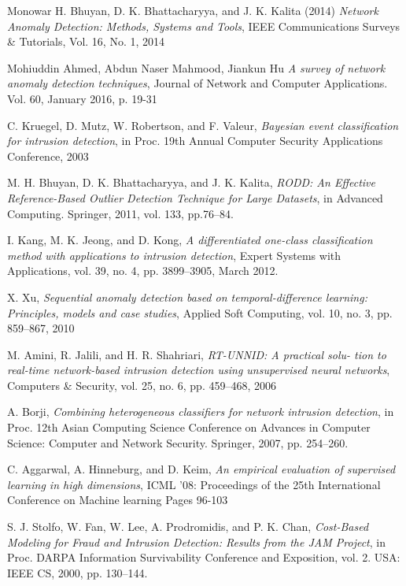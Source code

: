 \documentclass[reqno,openany,12pt]{amsbook}
\begin{document}
\begin{thebibliography}{99}
 Monowar H. Bhuyan, D. K. Bhattacharyya, and J. K. Kalita (2014) \emph{Network Anomaly Detection: Methods, Systems and Tools}, IEEE Communications Surveys \& Tutorials, Vol. 16, No. 1, 2014

 Mohiuddin Ahmed, Abdun Naser Mahmood, Jiankun Hu \emph{A survey of network anomaly detection techniques}, Journal of Network and Computer Applications. Vol. 60, January 2016, p. 19-31

 C. Kruegel, D. Mutz, W. Robertson, and F. Valeur, \emph{Bayesian event classification for intrusion detection}, in Proc. 19th Annual Computer Security Applications Conference, 2003

 M. H. Bhuyan, D. K. Bhattacharyya, and J. K. Kalita, \emph{RODD: An Effective Reference-Based Outlier Detection Technique for Large Datasets}, in Advanced Computing. Springer, 2011, vol. 133, pp.76–84.

 I. Kang, M. K. Jeong, and D. Kong, \emph{A differentiated one-class classification method with applications to intrusion detection}, Expert Systems with Applications, vol. 39, no. 4, pp. 3899–3905, March 2012.

 X. Xu, \emph{Sequential anomaly detection based on temporal-difference
learning: Principles, models and case studies}, Applied Soft Computing, vol. 10, no. 3, pp. 859–867, 2010

 M. Amini, R. Jalili, and H. R. Shahriari, \emph{RT-UNNID: A practical solu-
tion to real-time network-based intrusion detection using unsupervised neural networks}, Computers \& Security, vol. 25, no. 6, pp. 459–468, 2006

 A. Borji, \emph{Combining heterogeneous classifiers for network intrusion
detection}, in Proc. 12th Asian Computing Science Conference on Advances in Computer Science: Computer and Network Security. Springer, 2007, pp. 254–260.

 C. Aggarwal, A. Hinneburg, and D. Keim, \emph{An empirical evaluation of supervised learning in high dimensions}, ICML '08: Proceedings of the 25th International Conference on Machine learning Pages 96-103

 S. J. Stolfo, W. Fan, W. Lee, A. Prodromidis, and P. K. Chan, \emph{Cost-Based Modeling for Fraud and Intrusion Detection: Results from the JAM Project}, in Proc. DARPA Information Survivability Conference and Exposition, vol. 2. USA: IEEE CS, 2000, pp. 130–144.


\end{thebibliography}
\end{document}
